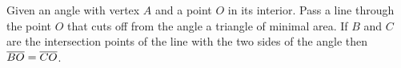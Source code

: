 \begin{proposition}
    Given an angle with vertex \(A\) and a point \(O\) in its interior. Pass a line through the point \(O\) that cuts off from the angle a triangle of minimal area. If \(B\) and \(C\) are the intersection points of the line with the two sides of the angle then \(\overline{BO} = \overline{CO}\).
\end{proposition}